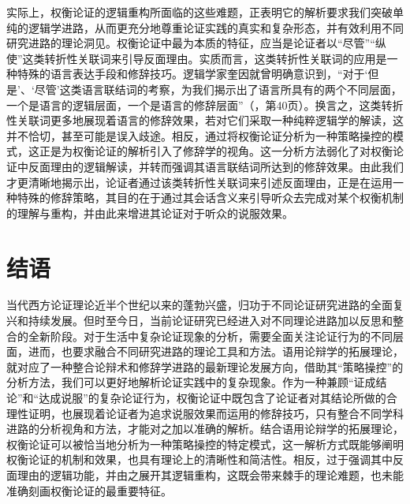\documentclass[b5paper,10.5pt,onecolumn,twoside,UTF8]{article}
\begin{document}
实际上，权衡论证的逻辑重构所面临的这些难题，正表明它的解析要求我们突破单纯的逻辑学进路，从而更充分地尊重论证实践的真实和复杂形态，并有效利用不同研究进路的理论洞见。权衡论证中最为本质的特征，应当是论证者以“尽管”“纵使”这类转折性关联词来引导反面理由。实质而言，这类转折性关联词的应用是一种特殊的语言表达手段和修辞技巧。逻辑学家奎因就曾明确意识到，“对于‘但是’、‘尽管’这类语言联结词的考察，为我们揭示出了语言所具有的两个不同层面，一个是语言的逻辑层面，一个是语言的修辞层面”（\parencite{a12}，第40页）。换言之，这类转折性关联词更多地展现着语言的修辞效果，若对它们采取一种纯粹逻辑学的解读，这并不恰切，甚至可能是误入歧途。相反，通过将权衡论证分析为一种策略操控的模式，这正是为权衡论证的解析引入了修辞学的视角。这一分析方法弱化了对权衡论证中反面理由的逻辑解读，并转而强调其语言联结词所达到的修辞效果。由此我们才更清晰地揭示出，论证者通过该类转折性关联词来引述反面理由，正是在运用一种特殊的修辞策略，其目的在于通过其会话含义来引导听众去完成对某个权衡机制的理解与重构，并由此来增进其论证对于听众的说服效果。

\vspace{-0.5em}

\section{结语}

\vspace{-0.5em}

当代西方论证理论近半个世纪以来的蓬勃兴盛，归功于不同论证研究进路的全面复兴和持续发展。但时至今日，当前论证研究已经进入对不同理论进路加以反思和整合的全新阶段。对于生活中复杂论证现象的分析，需要全面关注论证行为的不同层面，进而，也要求融合不同研究进路的理论工具和方法。语用论辩学的拓展理论，就对应了一种整合论辩术和修辞学进路的最新理论发展方向，借助其“策略操控”的分析方法，我们可以更好地解析论证实践中的复杂现象。作为一种兼顾“证成结论”和“达成说服”的复杂论证行为，权衡论证中既包含了论证者对其结论所做的合理性证明，也展现着论证者为追求说服效果而运用的修辞技巧，只有整合不同学科进路的分析视角和方法，才能对之加以准确的解析。结合语用论辩学的拓展理论，权衡论证可以被恰当地分析为一种策略操控的特定模式，这一解析方式既能够阐明权衡论证的机制和效果，也具有理论上的清晰性和简洁性。相反，过于强调其中反面理由的逻辑功能，并由之展开其逻辑重构，这既会带来棘手的理论难题，也未能准确刻画权衡论证的最重要特征。


\vspace{0ex} 
\printbibliography
\end{document}
